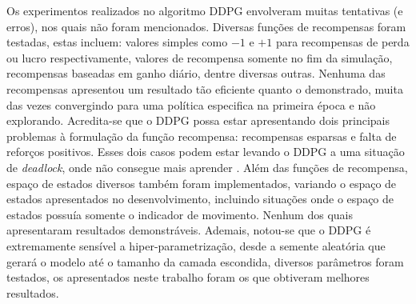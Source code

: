 Os experimentos realizados no algoritmo \acrshort{DDPG} envolveram muitas tentativas (e erros), nos quais não foram mencionados. Diversas funções de recompensas foram testadas, estas incluem: valores simples como $-1$ e $+1$ para recompensas de perda ou lucro respectivamente, valores de recompensa somente no fim da simulação, recompensas baseadas em ganho diário, dentre diversas outras. Nenhuma das recompensas apresentou um resultado tão eficiente quanto o demonstrado, muita das vezes convergindo para uma política especifica na primeira época e não explorando. Acredita-se que o \acrshort{DDPG} possa estar apresentando dois principais problemas à formulação da função recompensa: recompensas esparsas e falta de reforços positivos. Esses dois casos podem estar levando o \acrshort{DDPG} a uma situação de \emph{deadlock}, onde não consegue mais aprender \cite{matheron2019problem}. Além das funções de recompensa, espaço de estados diversos também foram implementados, variando o espaço de estados apresentados no desenvolvimento, incluindo situações onde o espaço de estados possuía somente o indicador de movimento. Nenhum dos quais apresentaram resultados demonstráveis. Ademais, notou-se que o \acrshort{DDPG} é extremamente sensível a hiper-parametrização, desde a semente aleatória que gerará o modelo até o tamanho da camada escondida, diversos parâmetros foram testados, os apresentados neste trabalho foram os que obtiveram melhores resultados.